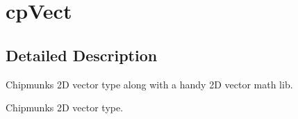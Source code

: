 \hypertarget{group__cp_vect}{}\section{cp\+Vect}
\label{group__cp_vect}


\subsection{Detailed Description}
Chipmunk\textquotesingle{}s 2D vector type along with a handy 2D vector math lib.

Chipmunk\textquotesingle{}s 2D vector type. 